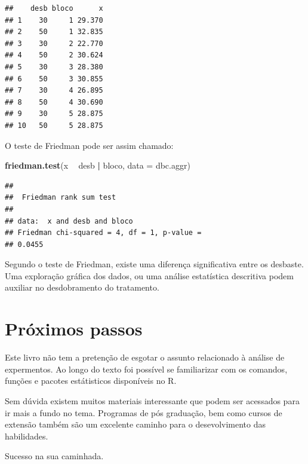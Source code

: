 \documentclass[
]{article}
\newenvironment{Shaded}{\begin{snugshade}}{\end{snugshade}}
\newcommand{\DataTypeTok}[1]{\textcolor[rgb]{0.13,0.29,0.53}{#1}}
\newcommand{\KeywordTok}[1]{\textcolor[rgb]{0.13,0.29,0.53}{\textbf{#1}}}
\newcommand{\NormalTok}[1]{#1}
\newcommand{\OperatorTok}[1]{\textcolor[rgb]{0.81,0.36,0.00}{\textbf{#1}}}
\newcommand{\StringTok}[1]{\textcolor[rgb]{0.31,0.60,0.02}{#1}}
\begin{document}
\begin{verbatim}
##    desb bloco      x
## 1    30     1 29.370
## 2    50     1 32.835
## 3    30     2 22.770
## 4    50     2 30.624
## 5    30     3 28.380
## 6    50     3 30.855
## 7    30     4 26.895
## 8    50     4 30.690
## 9    30     5 28.875
## 10   50     5 28.875
\end{verbatim}

O teste de Friedman pode ser assim chamado:

\begin{Shaded}
\begin{Highlighting}[]
\KeywordTok{friedman.test}\NormalTok{(x }\OperatorTok{~}\StringTok{ }\NormalTok{desb }\OperatorTok{|}\StringTok{ }\NormalTok{bloco, }\DataTypeTok{data =}\NormalTok{ dbc.aggr)}
\end{Highlighting}
\end{Shaded}

\begin{verbatim}
## 
##  Friedman rank sum test
## 
## data:  x and desb and bloco
## Friedman chi-squared = 4, df = 1, p-value =
## 0.0455
\end{verbatim}

Segundo o teste de Friedman, existe uma diferença significativa entre os desbaste. Uma exploração gráfica dos dados, ou uma análise estatística descritiva podem auxiliar no desdobramento do tratamento.

\hypertarget{pruxf3ximos-passos}{%
\section{Próximos passos}\label{pruxf3ximos-passos}}

Este livro não tem a pretenção de esgotar o assunto relacionado à análise de expermentos. Ao longo do texto foi possível se familiarizar com os comandos, funções e pacotes estátisticos disponíveis no R.

Sem dúvida existem muitos materiais interessante que podem ser acessados para ir mais a fundo no tema. Programas de pós graduação, bem como cursos de extensão também são um excelente caminho para o desevolvimento das habilidades.

Sucesso na sua caminhada.
\end{document}
